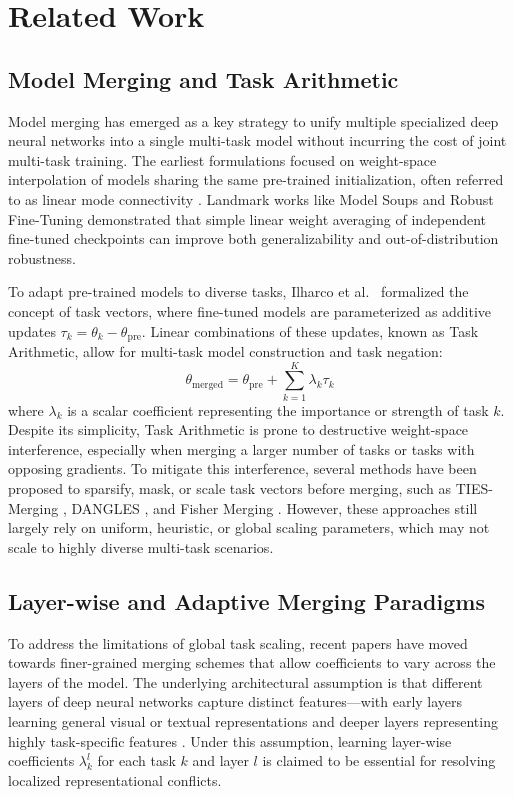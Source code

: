 \section{Related Work}
\label{sec:related_work}

\subsection{Model Merging and Task Arithmetic}
Model merging has emerged as a key strategy to unify multiple specialized deep neural networks into a single multi-task model without incurring the cost of joint multi-task training. The earliest formulations focused on weight-space interpolation of models sharing the same pre-trained initialization, often referred to as linear mode connectivity \cite{mirzadeh2020linear, frankle2020linear}. Landmark works like Model Soups \cite{wortsman2022model} and Robust Fine-Tuning \cite{wortsman2022robust} demonstrated that simple linear weight averaging of independent fine-tuned checkpoints can improve both generalizability and out-of-distribution robustness.

To adapt pre-trained models to diverse tasks, Ilharco et al.\ \cite{ilharco2022editing} formalized the concept of task vectors, where fine-tuned models are parameterized as additive updates $\tau_k = \theta_k - \theta_{\text{pre}}$. Linear combinations of these updates, known as Task Arithmetic, allow for multi-task model construction and task negation:
\begin{equation}
    \theta_{\text{merged}} = \theta_{\text{pre}} + \sum_{k=1}^K \lambda_k \tau_k
\end{equation}
where $\lambda_k$ is a scalar coefficient representing the importance or strength of task $k$. Despite its simplicity, Task Arithmetic is prone to destructive weight-space interference, especially when merging a larger number of tasks or tasks with opposing gradients. To mitigate this interference, several methods have been proposed to sparsify, mask, or scale task vectors before merging, such as TIES-Merging \cite{yadav2023ties}, DANGLES \cite{jin2023dangles}, and Fisher Merging \cite{matena2022merging}. However, these approaches still largely rely on uniform, heuristic, or global scaling parameters, which may not scale to highly diverse multi-task scenarios.

\subsection{Layer-wise and Adaptive Merging Paradigms}
To address the limitations of global task scaling, recent papers have moved towards finer-grained merging schemes that allow coefficients to vary across the layers of the model. The underlying architectural assumption is that different layers of deep neural networks capture distinct features---with early layers learning general visual or textual representations and deeper layers representing highly task-specific features \cite{dosovitskiy2020vit, nguyen2020wide}. Under this assumption, learning layer-wise coefficients $\lambda^l_k$ for each task $k$ and layer $l$ is claimed to be essential for resolving localized representational conflicts.

